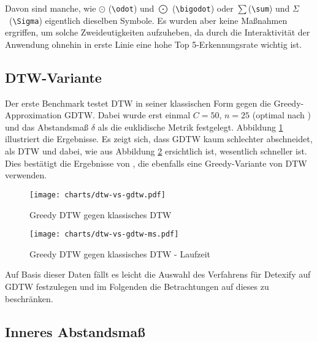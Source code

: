 Davon sind manche, wie $\odot$ (\verb!\odot!) und $\bigodot$ (\verb!\bigodot!) oder $\sum$(\verb!\sum!) und $\Sigma$~(\verb!\Sigma!) eigentlich dieselben Symbole. Es wurden aber keine Maßnahmen ergriffen, um solche Zweideutigkeiten aufzuheben, da durch die Interaktivität der Anwendung ohnehin in erste Linie eine hohe Top 5-Erkennungsrate wichtig ist.

\subsection{DTW-Variante}
\label{sub:variant}

Der erste Benchmark testet DTW in seiner klassischen Form gegen die Greedy-Approximation GDTW. Dabei wurde erst einmal $C=50$, $n=25$ (optimal nach \citet{Golubitsky:2009p1842}) und das Abstandsmaß $\delta$ als die euklidische Metrik festgelegt. Abbildung \ref{chart:dtw-vs-gdtw} illustriert die Ergebnisse. Es zeigt sich, dass GDTW kaum schlechter abschneidet, als DTW und dabei, wie aus Abbildung \ref{chart:dtw-vs-gdtw-ms} ersichtlich ist, wesentlich schneller ist. Dies bestätigt die Ergebnisse von \citet{MacLean:2010p9970}, die ebenfalls eine Greedy-Variante von DTW verwenden.

\begin{figure}[htbp]
  \begin{center}
    \texttt{[image: charts/dtw-vs-gdtw.pdf]}
  \end{center}
  \caption{Greedy DTW gegen klassisches DTW}
  \label{chart:dtw-vs-gdtw}
\end{figure}

\begin{figure}[htbp]
  \begin{center}
    \texttt{[image: charts/dtw-vs-gdtw-ms.pdf]}
  \end{center}
  \caption{Greedy DTW gegen klassisches DTW - Laufzeit}
  \label{chart:dtw-vs-gdtw-ms}
\end{figure}

Auf Basis dieser Daten fällt es leicht die Auswahl des Verfahrens für Detexify auf GDTW festzulegen und im Folgenden die Betrachtungen auf dieses zu beschränken.


\subsection{Inneres Abstandsmaß} %
\label{sub:inneres_abstandsmaß}

